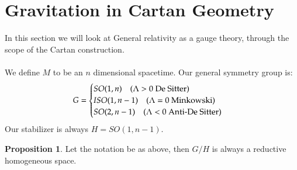 \documentclass[12pt,a4paper]{report}
\theoremstyle{definition}
\theoremstyle{Theorem}
\newtheorem{Prop}[Def]{Proposition}
\theoremstyle{break}
\theoremstyle{definition}
\begin{document}
	\section{Gravitation in Cartan Geometry}
	In this section we will look at General relativity as a gauge theory, through the scope of the Cartan construction.
	\\\\
	We define $M$ to be an $n$ dimensional spacetime. Our general symmetry group is:
	$$G=\begin{cases}
		SO(1,n) \hspace{10 pt}(\Lambda>0 \hbox{ De Sitter})\\
		ISO(1,n-1)\hspace{10 pt} (\Lambda=0 \hbox{ Minkowski})\\
		SO(2,n-1)\hspace{10 pt} (\Lambda<0 \hbox{ Anti-De Sitter})
	\end{cases}$$
	Our stabilizer is always $H=SO(1,n-1)$.
	\begin{Prop}
		Let the notation be as above, then $G/H$ is always a reductive homogeneous space.
	\end{Prop}
\end{document}
